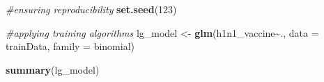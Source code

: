 \documentclass[
]{article}
\newenvironment{Shaded}{\begin{snugshade}}{\end{snugshade}}
\newcommand{\AttributeTok}[1]{\textcolor[rgb]{0.13,0.29,0.53}{#1}}
\newcommand{\CommentTok}[1]{\textcolor[rgb]{0.56,0.35,0.01}{\textit{#1}}}
\newcommand{\DecValTok}[1]{\textcolor[rgb]{0.00,0.00,0.81}{#1}}
\newcommand{\FunctionTok}[1]{\textcolor[rgb]{0.13,0.29,0.53}{\textbf{#1}}}
\newcommand{\NormalTok}[1]{#1}
\newcommand{\OtherTok}[1]{\textcolor[rgb]{0.56,0.35,0.01}{#1}}
\newcommand{\SpecialCharTok}[1]{\textcolor[rgb]{0.81,0.36,0.00}{\textbf{#1}}}
\begin{document}
\begin{Shaded}
\begin{Highlighting}[]
\CommentTok{\#ensuring reproducibility }
\FunctionTok{set.seed}\NormalTok{(}\DecValTok{123}\NormalTok{)}

\CommentTok{\#applying training algorithms}
\NormalTok{lg\_model }\OtherTok{\textless{}{-}} \FunctionTok{glm}\NormalTok{(h1n1\_vaccine}\SpecialCharTok{\textasciitilde{}}\NormalTok{., }\AttributeTok{data =}\NormalTok{ trainData, }\AttributeTok{family =}\NormalTok{ binomial)}
\end{Highlighting}
\end{Shaded}

\begin{Shaded}
\begin{Highlighting}[]
\FunctionTok{summary}\NormalTok{(lg\_model)}
\end{Highlighting}
\end{Shaded}
\end{document}
